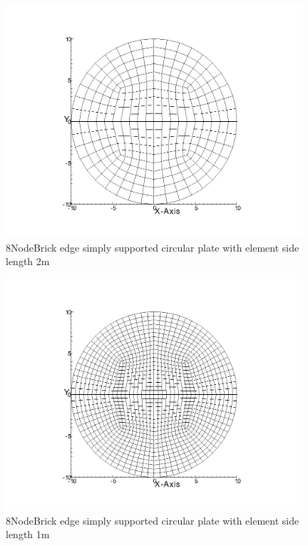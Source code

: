 \documentclass[fleqn,11pt,letter]{article}
\begin{document}
\begin{figure}[H]
  \centering
  \includegraphics[width=11cm]{../Figure_files/8NodeBrick/circular_plate3.png}
  \caption{8NodeBrick edge simply supported circular plate with element side length 2m }
  \label{fig 8NodeBrick edges simply supported circular plate with element side length 2m }
\end{figure}

\newpage

\begin{figure}[H]
  \centering
  \includegraphics[width=11cm]{../Figure_files/8NodeBrick/circular_plate4.png}
  \caption{8NodeBrick edge simply supported circular plate with element side length 1m }
  \label{fig 8NodeBrick edges simply supported circular plate with element side length 1m }
\end{figure}
\end{document}
